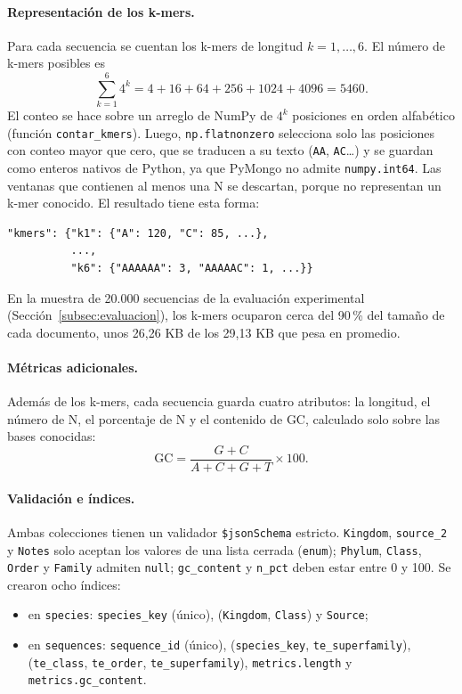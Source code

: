 \documentclass[pdflatex,lineno,referee,sn-vancouver-num]{sn-jnl}
\theoremstyle{thmstyleone}%
\theoremstyle{thmstyletwo}%
\theoremstyle{thmstylethree}%
\begin{document}
\paragraph{Representación de los k-mers.} Para cada secuencia se cuentan los k-mers de longitud $k=1,\dots,6$. El número de k-mers posibles es
\[
  \sum_{k=1}^{6} 4^k = 4 + 16 + 64 + 256 + 1024 + 4096 = 5460.
\]
El conteo se hace sobre un arreglo de NumPy de $4^k$ posiciones en orden alfabético (función \texttt{contar\_kmers}). Luego, \texttt{np.flatnonzero} selecciona solo las posiciones con conteo mayor que cero, que se traducen a su texto (\texttt{AA}, \texttt{AC}\ldots) y se guardan como enteros nativos de Python, ya que PyMongo no admite \texttt{numpy.int64}. Las ventanas que contienen al menos una N se descartan, porque no representan un k-mer conocido. El resultado tiene esta forma:
\begin{lstlisting}[style=py]
"kmers": {"k1": {"A": 120, "C": 85, ...},
          ...,
          "k6": {"AAAAAA": 3, "AAAAAC": 1, ...}}
\end{lstlisting}
En la muestra de 20.000 secuencias de la evaluación experimental (Sección~\ref{subsec:evaluacion}), los k-mers ocuparon cerca del 90\,\% del tamaño de cada documento, unos 26,26 KB de los 29,13 KB que pesa en promedio.

\paragraph{Métricas adicionales.} Además de los k-mers, cada secuencia guarda cuatro atributos: la longitud, el número de N, el porcentaje de N y el contenido de GC, calculado solo sobre las bases conocidas:
\[
  \mathrm{GC} = \frac{G + C}{A + C + G + T} \times 100.
\]

\paragraph{Validación e índices.} Ambas colecciones tienen un validador \texttt{\$jsonSchema} estricto. \texttt{Kingdom}, \texttt{source\_2} y \texttt{Notes} solo aceptan los valores de una lista cerrada (\texttt{enum}); \texttt{Phylum}, \texttt{Class}, \texttt{Order} y \texttt{Family} admiten \texttt{null}; \texttt{gc\_content} y \texttt{n\_pct} deben estar entre 0 y 100. Se crearon ocho índices:
\begin{itemize}
  \item en \texttt{species}: \texttt{species\_key} (único), (\texttt{Kingdom}, \texttt{Class}) y \texttt{Source};
  \item en \texttt{sequences}: \texttt{sequence\_id} (único), (\texttt{species\_key}, \texttt{te\_superfamily}), (\texttt{te\_class}, \texttt{te\_order}, \texttt{te\_superfamily}), \texttt{metrics.length} y \texttt{metrics.gc\_content}.
\end{itemize}
\end{document}

